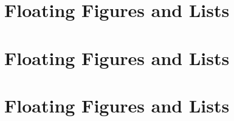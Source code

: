 \documentclass[letterpaper,twocolumn,10pt]{article}
\begin{document}
\section{Floating Figures and Lists}


\section{Floating Figures and Lists}



\section{Floating Figures and Lists}





\end{document}
